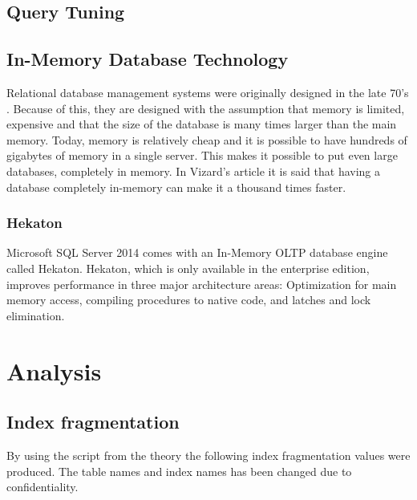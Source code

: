 \documentclass{cslthse-msc}
\begin{document}
\subsection{Query Tuning}

\subsection{In-Memory Database Technology}
Relational database management systems were originally designed in the late 70's \cite{Nevarez}. Because of this, they are designed with the assumption that memory is limited, expensive and that the size of the database is many times larger than the main memory. Today, memory is relatively cheap and it is possible to have hundreds of gigabytes of memory in a single server. This makes it possible to put even large databases, completely in memory. In Vizard's article\cite{Vizard12} it is said that having a database completely in-memory can make it a thousand times faster.

\subsubsection{Hekaton}
Microsoft SQL Server 2014 comes with an In-Memory OLTP database engine called Hekaton. Hekaton, which is only available in the enterprise edition, improves performance in three major architecture areas: Optimization for main memory access, compiling procedures to native code, and latches and lock elimination.


\section{Analysis}

\subsection{Index fragmentation}
By using the script from the theory the following index fragmentation values were produced. The table names and index names has been changed due to confidentiality.
\end{document}
